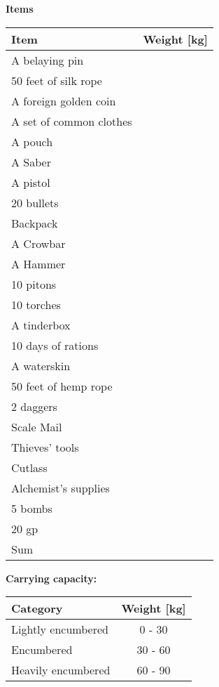 \documentclass[11pt]{article}
\begin{document}
\clearpage

	\begin{center}
{\LARGE \textbf{Items}}
	\end{center}

	\begin{tabularx}{\textwidth}{X|r}
Item & Weight [kg] \\
\hline
A belaying pin 								&  			\\
50 feet of silk rope						&  			\\
A foreign golden coin 						&  			\\
A set of common clothes 					&  			\\
A pouch		 								&  			\\
A Saber		 								&  			\\
A pistol	 								&  			\\
20 bullets	 								&  			\\
Backpack 									&  			\\
A Crowbar	 								&  			\\
A Hammer	 								&  			\\
10 pitons	 								&  			\\
10 torches	 								&  			\\
A tinderbox	 								&  			\\
10 days of rations							&  			\\
A waterskin 								&  			\\
50 feet of hemp rope 						&  			\\
2 daggers 									&  			\\
Scale Mail	 								&  			\\
Thieves' tools 								&  			\\
Cutlass		 								&  			\\
Alchemist's supplies 						&  			\\
5 bombs		 								&  			\\
20 gp					 					& 			\\
\hline
Sum 										& 
	\end{tabularx}

\vspace{10mm}

\textbf{Carrying capacity:} \\

	\begin{tabular}{l|c}
Category & Weight [kg] \\
\hline
Lightly encumbered 	& 0 - 30 	\\
Encumbered 			& 30 - 60 	\\
Heavily encumbered	& 60 - 90
	\end{tabular}
\end{document}

